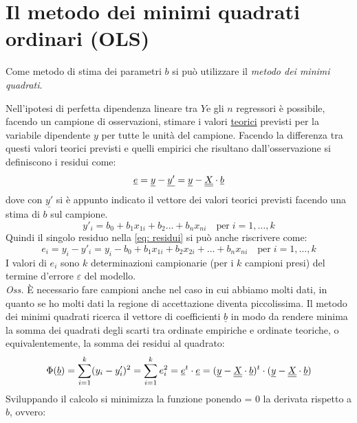 \section{Il metodo dei minimi quadrati ordinari (OLS)}


Come metodo di stima dei parametri $b$ si può utilizzare il \textit{metodo dei minimi quadrati}.

Nell'ipotesi di perfetta dipendenza lineare tra $Y$e gli $n$ regressori è possibile, facendo un campione di osservazioni, stimare i valori \underline{teorici} previsti per la variabile dipendente $y$ per tutte le unità del campione. Facendo la differenza tra questi valori teorici previsti e quelli empirici che risultano dall'osservazione si definiscono i residui come:
\begin{equation}
\underline{e} = \underline{y} - \underline{y'} = \underline{y} - \underline{\underline{X}} \cdot \underline{b}
\label{eq: residui}
\end{equation}
dove con $\underline{y'}$ si è appunto indicato il vettore dei valori teorici previsti facendo una stima di $b$ sul campione.
\begin{equation}
y'_i = b_0 + b_1 x_{1i} + b_2 \dots + b_n x_{ni} \quad \text{per} \; i= 1, \dots, k
\end{equation}
Quindi il singolo residuo nella \eqref{eq: residui} si può anche riscrivere come:
\begin{equation}
e_i = y_i - y'_i = y_i - b_0 + b_1 x_{1i} + b_2 x_{2i} + \dots + b_n x_{ni} \quad \text{per} \; i= 1, \dots, k
\end{equation}
I valori di $e_i$ sono $k$ determinazioni campionarie (per i $k$ campioni presi) del termine d'errore $\varepsilon$ del modello.\\
\textit{Oss.} È necessario fare campioni anche nel caso in cui abbiamo
molti dati, in quanto se ho molti dati la regione di accettazione
diventa piccolissima.
Il metodo dei minimi quadrati ricerca il vettore di coefficienti $\underline{b}$ in modo da rendere minima la somma dei quadrati degli scarti tra ordinate empiriche e ordinate teoriche, o equivalentemente, la somma dei residui al quadrato:
\begin{equation}
\Phi(\underline{b}) = \sum_{i=1}^k (y_i - y'_i)^2 = \sum_{i=1}^k e_i^2 = \underline{e}^t 	\cdot \underline{e} = (\underline{y} - \underline{\underline{X}} \cdot \underline{b})^t \cdot (\underline{y} - \underline{\underline{X}} \cdot \underline{b})
\end{equation}
Sviluppando il calcolo si minimizza la funzione ponendo = 0 la derivata rispetto a $b$, ovvero:
